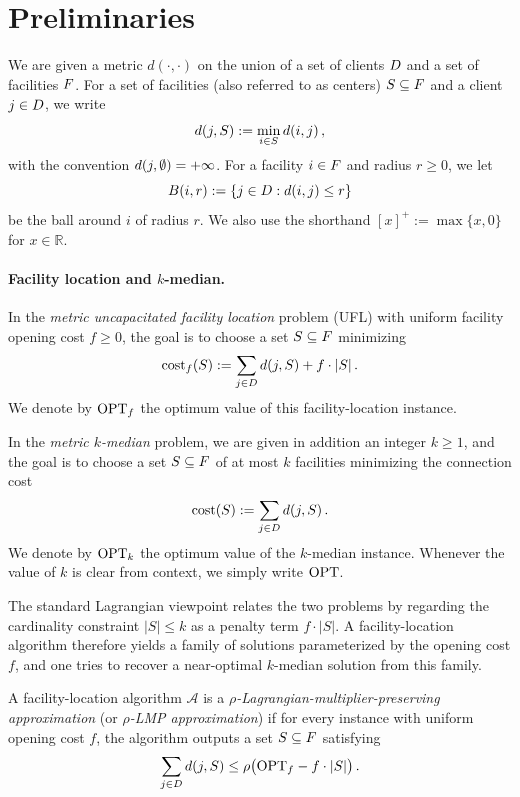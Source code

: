 \section{Preliminaries}
\label{sec:prelim}
We are given a metric $d(\cdot,\cdot)$ on the union of a set of clients $D$ and a set of facilities $F$. For a set of facilities (also referred to as centers) $S \subseteq F$ and a client $j \in D$, we write
\[
    d(j,S) := \min_{i \in S} d(i,j)\,,
\]
with the convention $d(j,\emptyset)=+\infty$. For a facility $i \in F$ and radius $r \ge 0$, we let
\[
    B(i,r) := \{j \in D : d(i,j) \le r\}
\]
be the ball around $i$ of radius $r$.
We also use the shorthand $[x]^+ := \max\{x,0\}$ for $x \in \mathbb{R}$.

\paragraph{Facility location and $k$-median.}
In the \emph{metric uncapacitated facility location} problem (UFL) with uniform facility opening cost $f \ge 0$, the goal is to choose a set $S \subseteq F$ minimizing
\[
    \textnormal{cost}_f(S) := \sum_{j \in D} d(j,S) + f\cdot |S|\,.
\]
We denote by $\textnormal{OPT}_f$ the optimum value of this facility-location instance.

In the \emph{metric $k$-median} problem, we are given in addition an integer $k \ge 1$, and the goal is to choose a set $S \subseteq F$ of at most $k$ facilities minimizing the connection cost
\[
    \text{cost}(S) := \sum_{j \in D} d(j,S)\,.
\]
We denote by $\textnormal{OPT}_k$ the optimum value of the $k$-median instance. Whenever the value of $k$ is clear from context, we simply write $\textnormal{OPT}$.

The standard Lagrangian viewpoint relates the two problems by regarding the cardinality constraint $|S| \le k$ as a penalty term $f \cdot |S|$. A facility-location algorithm therefore yields a family of solutions parameterized by the opening cost $f$, and one tries to recover a near-optimal $k$-median solution from this family.

\begin{definition}
    \label{def:lmp}
    A facility-location algorithm $\mathcal{A}$ is a \emph{$\rho$-Lagrangian-multiplier-preserving approximation} (or \emph{$\rho$-LMP approximation}) if for every instance with uniform opening cost $f$, the algorithm outputs a set $S \subseteq F$ satisfying
    \[
        \sum_{j \in D} d(j,S) \le \rho\bigl(\textnormal{OPT}_f - f\cdot |S|\bigr)\,.
    \]
\end{definition}
